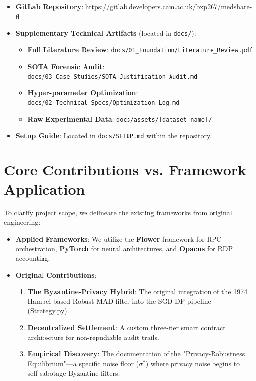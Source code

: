 \documentclass[10pt, a4paper, twocolumn]{article}
\begin{document}
\begin{itemize}
    \item \textbf{GitLab Repository}: \url{https://gitlab.developers.cam.ac.uk/bxp267/medshare-fl}
    \item \textbf{Supplementary Technical Artifacts} (located in \texttt{docs/}):
    \begin{itemize}
        \item \textbf{Full Literature Review}: \texttt{docs/01\_Foundation/Literature\_Review.pdf}
        \item \textbf{SOTA Forensic Audit}: \texttt{docs/03\_Case\_Studies/SOTA\_Justification\_Audit.md}
        \item \textbf{Hyper-parameter Optimization}: \texttt{docs/02\_Technical\_Specs/Optimization\_Log.md}
        \item \textbf{Raw Experimental Data}: \texttt{docs/assets/[dataset\_name]/}
    \end{itemize}
    \item \textbf{Setup Guide}: Located in \texttt{docs/SETUP.md} within the repository.
\end{itemize}

\section{Core Contributions vs. Framework Application}
\label{sec:novelty}

To clarify project scope, we delineate the existing frameworks from original engineering:

\begin{itemize}
    \item \textbf{Applied Frameworks}: We utilize the \textbf{Flower} framework for RPC orchestration, \textbf{PyTorch} for neural architectures, and \textbf{Opacus} for RDP accounting.
    \item \textbf{Original Contributions}:
    \begin{enumerate}
        \item \textbf{The Byzantine-Privacy Hybrid}: The original integration of the 1974 Hampel-based Robust-MAD filter into the SGD-DP pipeline (Strategy.py).
        \item \textbf{Decentralized Settlement}: A custom three-tier smart contract architecture for non-repudiable audit trails.
        \item \textbf{Empirical Discovery}: The documentation of the "Privacy-Robustness Equilibrium"—a specific noise floor ($\sigma^*$) where privacy noise begins to self-sabotage Byzantine filters.
    \end{enumerate}
\end{itemize}
\end{document}

